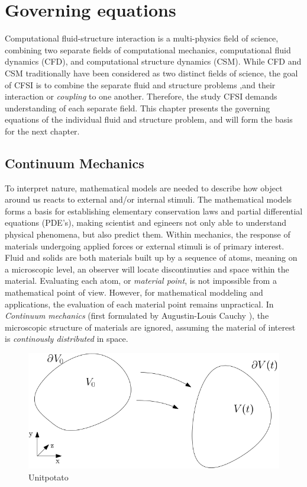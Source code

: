 \chapter{Governing equations}

Computational fluid-structure interaction is a multi-physics field of science, combining two separate fields of computational mechanics, computational fluid dynamics (CFD), and computational structure dynamics (CSM). While CFD and CSM traditionally have been considered as two distinct fields of science,  the goal of CFSI is to combine the separate fluid and structure problems ,and their interaction or \textit{coupling} to one another. Therefore, the study CFSI demands understanding of each separate field. This chapter presents the governing equations of the individual fluid and structure problem, and will form the basis for the next chapter.



\section{Continuum Mechanics}
To interpret nature, mathematical models are needed to describe how object around us reacts to external and/or internal stimuli. 
The mathematical models forms a basis for establishing elementary conservation laws and partial differential equations (PDE's), making scientist and egineers not only able to understand physical phenomena, but also predict them. Within mechanics, the response of materials undergoing applied forces or external stimuli is of primary interest.  \\
Fluid and solids are both materials built up by a sequence of atoms, meaning on a microscopic level, an observer will locate discontinuties and space within the material. Evaluating each atom, or \textit{material point}, is not impossible from a mathematical point of view. However, for mathematical moddeling and applications, the evaluation of each material point remains unpractical. In \textit{Continuum mechanics} (first formulated by Augustin-Louis Cauchy \cite{Merodio2011}), the microscopic structure of materials are  ignored,  assuming the material of interest is \textit{continously distributed} in space. \newpage

\begin{figure}[h!]
  \centering
    \includegraphics[scale=0.5]{./Fig/unitpotato.png}
      \caption{Unitpotato}
\end{figure}


